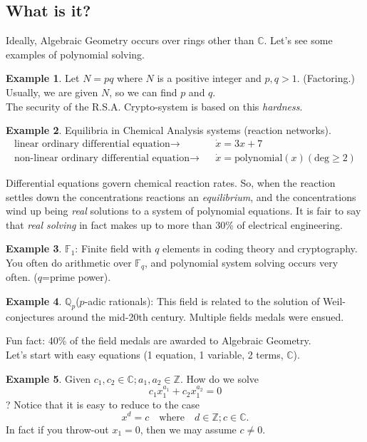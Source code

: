 \documentclass[]{article}
\theoremstyle{definition}
\newtheorem{ex}{Example}[section]
\begin{document}
		\subsection{What is it?}
		Ideally, Algebraic Geometry occurs over rings other than $\mathbb{C}$. Let's see some examples of polynomial solving.
			\begin{ex}
			Let $N=pq$ where $N$ is a positive integer and $p,q >1$. (Factoring.)
			Usually, we are given $N$, so we can find $p$ and $q$.\\
			The security of the R.S.A. Crypto-system is based on this \emph{hardness}.
			\end{ex}
			\begin{ex}
			Equilibria in Chemical Analysis systems (reaction networks).
			\begin{align*}
			\text{linear ordinary differential equation} \to &&\dot{x} = 3x+7\\
			\text{non-linear ordinary differential equation} \to &&\dot{x} = \text{polynomial}(x) (\text{deg}\geq 2)
			\end{align*}
			\end{ex}
			Differential equations govern chemical reaction rates. So, when the reaction settles down the concentrations reactions an \emph{equilibrium}, and the concentrations wind up being \emph{real} solutions to a system of polynomial equations.
			It is fair to say that \emph{real solving} in fact makes up to more than 30\% of electrical engineering.
			\begin{ex}
			$\mathbb{F}_1$: Finite field with $q$ elements in coding theory and cryptography. You often do arithmetic over $\mathbb{F}_q$, and polynomial system solving occurs very often. ($q$=prime power).
			\end{ex}
			\begin{ex}
			$\mathbb{Q}_p$($p$-adic rationals): This field is related to the solution of Weil-conjectures around the mid-20th century. Multiple fields medals were ensued.\\
			\end{ex}
			Fun fact: 40\% of the field medals are awarded to Algebraic Geometry.
			\\
			Let's start with easy equations (1 equation, 1 variable, 2 terms, $\mathbb{C}$).
			\begin{ex}
			Given $c_1,c_2 \in \mathbb{C}; a_1,a_2 \in \mathbb{Z}$. How do we solve
			\[ c_1x_1^{a_1}+c_2x_1^{a_2}=0\]?
			Notice that it is easy to reduce to the case
			\[ x^d=c \quad \text{where} \quad d\in\mathbb{Z}; c\in \mathbb{C}.\]
			In fact if you throw-out $x_1=0$, then we may assume $c\neq0$.
			\end{ex}
\end{document}

